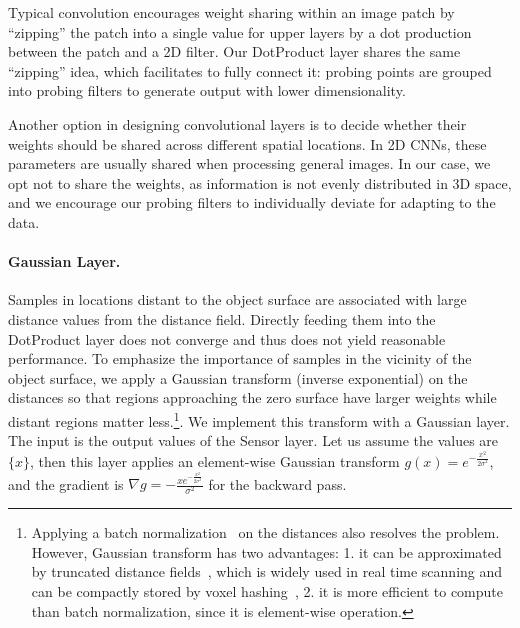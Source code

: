Typical convolution encourages weight sharing within an image patch by ``zipping'' the patch into a single value for upper layers by a dot production between the patch and a 2D filter. Our DotProduct layer shares the same ``zipping'' idea, which facilitates to fully connect it: probing points are grouped into probing filters to generate output with lower dimensionality. 

Another option in designing convolutional layers is to decide whether their weights should be shared across different spatial locations. In 2D CNNs, these parameters are usually shared when processing general images. In our case, we opt not to share the weights, as information is not evenly distributed in 3D space, and we encourage our probing filters to individually deviate for adapting to the data.

\paragraph{Gaussian Layer.} Samples in locations distant to the object surface are associated with large distance values from the distance field. Directly feeding them into the DotProduct layer does not converge and thus does not yield reasonable performance. To emphasize the importance of samples in the vicinity of the object surface, we apply a Gaussian transform (inverse exponential) on the distances so that regions approaching the zero surface have larger weights while distant regions matter less.\footnote{Applying a batch normalization~\cite{ioffe2015batch} on the distances also resolves the problem. However, Gaussian transform has two advantages: 1. it can be approximated by truncated distance fields~\cite{Curless_SIGGRAPH96_A}, which is widely used in real time scanning and can be compactly stored by voxel hashing~\cite{Niessner_ToG13_Real}, 2. it is more efficient to compute than batch normalization, since it is element-wise operation.}. We implement this transform with a Gaussian layer. The input is the output values of the Sensor layer. Let us assume the values are $\{x\}$, then this layer applies an element-wise Gaussian transform $g(x) = e^{-\frac{x^2}{2 {\sigma}^2}}$, and the gradient is $\nabla g = -\frac{x e^{-\frac{x^2}{2 {\sigma}^2}}}{{\sigma}^2}$ for the backward pass.


